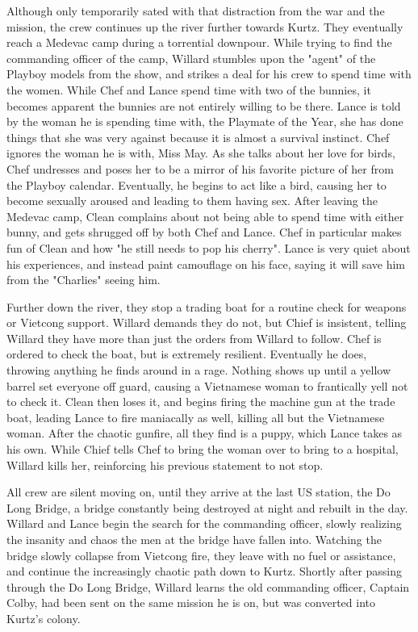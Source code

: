 \documentclass[a4paper,man,natbib]{apa6}
\begin{document}
Although only temporarily sated with that distraction from the war and the mission, the crew continues up the river further towards Kurtz. They eventually reach a Medevac camp during a torrential downpour. While trying to find the commanding officer of the camp, Willard stumbles upon the "agent" of the Playboy models from the show, and strikes a deal for his crew to spend time with the women. While Chef and Lance spend time with two of the bunnies, it becomes apparent the bunnies are not entirely willing to be there. Lance is told by the woman he is spending time with, the Playmate of the Year, she has done things that she was very against because it is almost a survival instinct. Chef ignores the woman he is with, Miss May. As she talks about her love for birds, Chef undresses and poses her to be a mirror of his favorite picture of her from the Playboy calendar. Eventually, he begins to act like a bird, causing her to become sexually aroused and leading to them having sex. After leaving the Medevac camp, Clean complains about not being able to spend time with either bunny, and gets shrugged off by both Chef and Lance. Chef in particular makes fun of Clean and how "he still needs to pop his cherry". Lance is very quiet about his experiences, and instead paint camouflage on his face, saying it will save him from the "Charlies" seeing him.

Further down the river, they stop a trading boat for a routine check for weapons or Vietcong support. Willard demands they do not, but Chief is insistent, telling Willard they have more than just the orders from Willard to follow. Chef is ordered to check the boat, but is extremely resilient. Eventually he does, throwing anything he finds around in a rage. Nothing shows up until a yellow barrel set everyone off guard, causing a Vietnamese woman to frantically yell not to check it. Clean then loses it, and begins firing the machine gun at the trade boat, leading Lance to fire maniacally as well, killing all but the Vietnamese woman. After the chaotic gunfire, all they find is a puppy, which Lance takes as his own. While Chief tells Chef to bring the woman over to bring to a hospital, Willard kills her, reinforcing his previous statement to not stop.

All crew are silent moving on, until they arrive at the last US station, the Do Long Bridge, a bridge constantly being destroyed at night and rebuilt in the day. Willard and Lance begin the search for the commanding officer, slowly realizing the insanity and chaos the men at the bridge have fallen into. Watching the bridge slowly collapse from Vietcong fire, they leave with no fuel or  assistance, and continue the increasingly chaotic path down to Kurtz. Shortly after passing through the Do Long Bridge, Willard learns the old commanding officer, Captain Colby, had been sent on the same mission he is on, but was converted into Kurtz's colony.
\end{document}
